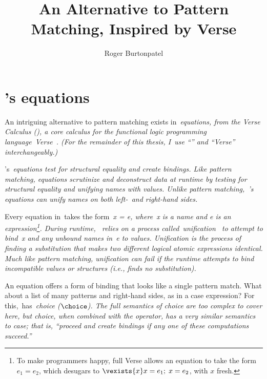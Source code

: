 \documentclass[manuscript,screen 12pt, nonacm]{acmart}
\title{An Alternative to Pattern Matching, Inspired by Verse}
\author{Roger Burtonpatel}
\affiliation{%
  \institution{Tufts University}
  \streetaddress{419 Boston Ave}
  \city{Medford}
  \state{Massachusetts}
  \country{USA}
  \postcode{02155}
}
\begin{document}
    
    \section{\VC's equations}
    \label{verseoverobservers}

    An intriguing alternative to pattern matching exists in~\it{equations}, from
    the Verse Calculus (\VC), a core calculus for the functional logic
    programming language~\it{Verse}~\citep{antoy2010functional,
    hanus2013functional, verse}. (For the remainder of this thesis, I~use “\VC”
    and “Verse” interchangeably.)



    \VC's~\it{equations} test for structural equality and create bindings. Like
    pattern matching, equations scrutinize and deconstruct data at runtime by
    testing for structural equality and unifying names with values. Unlike
    pattern matching,~\VC's equations can unify names on both left-~\it{and}
    right-hand sides. 

    Every equation in~\VC takes the form~\it{x = e}, where~\it{x} is a name and
    \it{e} is an expression\footnote{To make programmers happy, full Verse
    allows an equation to take the form $e_{1} = e_{2}$, which desugars to
    $\vexists{x} x = e_{1};\; x = e_{2}$, with $x$ fresh.}. During runtime,~\VC
    relies on a process called~\it{unification}~\citep{robinson} to attempt to
    bind~\it{x} and any unbound names in~\it{e} to values. Unification is the
    process of finding a substitution that makes two different logical atomic
    expressions identical. Much like pattern matching, unification can fail if
    the runtime attempts to bind incompatible values or structures (i.e., finds
    no substitution). 

    An equation offers a form of binding that looks like a single pattern match.
    What about a list of many patterns and right-hand sides, as in a case
    expression? For this,~\VC has~\it{choice} ($\choice$). The full semantics of
    choice are too complex to cover here, but choice, when combined with the
    \one operator, has a very similar semantics to case; that is, “proceed
    and create bindings if any one of these computations succeed.” 
\end{document}
